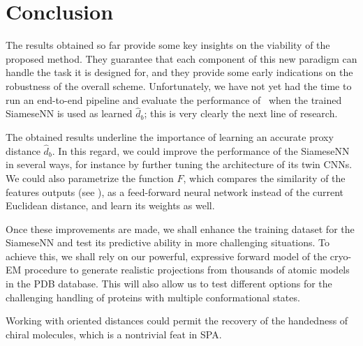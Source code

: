 \section{Conclusion}

The results obtained so far provide some key insights on the viability of the proposed method.
They guarantee that each component of this new paradigm can handle the task it is designed for, and they provide some early indications on the robustness of the overall scheme.
Unfortunately, we have not yet had the time to run an end-to-end pipeline and evaluate the performance of~ when the trained SiameseNN is used as learned $\widehat{d}_b$; this is very clearly the next line of research.

The obtained results underline the importance of learning an accurate proxy distance $\widehat{d}_b$.
In this regard, we could improve the performance of the SiameseNN in several ways, for instance by further tuning the architecture of its twin CNNs.
We could also parametrize the function $F$, which compares the similarity of the features outputs (see ), as a feed-forward neural network instead of the current Euclidean distance, and learn its weights as well.

Once these improvements are made, we shall enhance the training dataset for the SiameseNN and test its predictive ability in more challenging situations.
To achieve this, we shall rely on our powerful, expressive forward model of the cryo-EM procedure to generate realistic projections from thousands of atomic models in the PDB database.
This will also allow us to test different options for the challenging handling of proteins with multiple conformational states.

Working with oriented distances could permit the recovery of the handedness of chiral molecules, which is a nontrivial feat in SPA.
